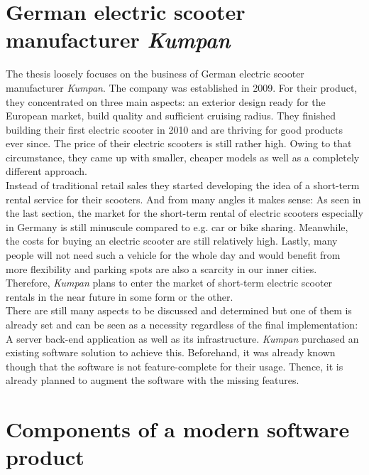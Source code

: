\documentclass[12pt,a4paper]{report}
\begin{document}
\section{German electric scooter manufacturer \textit{Kumpan}}

The thesis loosely focuses on the business of German electric scooter manufacturer \textit{Kumpan}.
The company was established in 2009. For their product, they concentrated on three main aspects:
an exterior design ready for the European market, build quality and sufficient cruising radius.
They finished building their first electric scooter in 2010 and are thriving for good products ever since.
The price of their electric scooters is still rather high. Owing to that circumstance,
they came up with smaller, cheaper models as well as a completely different approach.\\
Instead of traditional retail sales they started developing the idea of a
short-term rental service for their scooters. And from many angles it makes sense:
As seen in the last section, the market for the short-term rental of electric scooters
especially in Germany is still minuscule compared to e.g. car or bike sharing.
Meanwhile, the costs for buying an electric scooter are still relatively high.
Lastly, many people will not need such a vehicle for the whole day and would benefit
from more flexibility and parking spots are also a scarcity in our inner cities.
Therefore, \textit{Kumpan} plans to enter the market of short-term electric scooter rentals
in the near future in some form or the other.\\
There are still many aspects to be discussed and determined but one of them
is already set and can be seen as a necessity regardless of the final implementation:
A server back-end application as well as its infrastructure.
\textit{Kumpan} purchased an existing software solution to achieve this.
Beforehand, it was already known though that the software is not feature-complete
for their usage. Thence, it is already planned to augment the software with the missing
features.


\section{Components of a modern software product}
\end{document}
